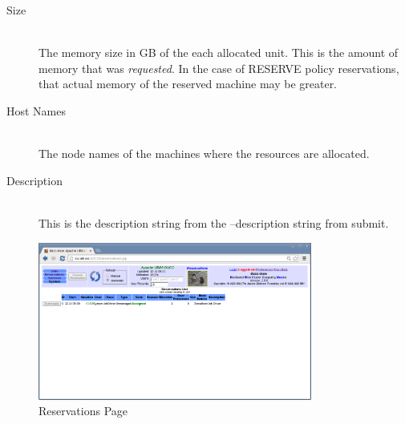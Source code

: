 \begin{description}
\item[Size] \hfill \\
  The memory size in GB of the each allocated unit.  This is the amount of memory that
  was {\em requested}.  In the case of RESERVE policy reservations, that actual memory
  of the reserved machine may be greater.
  
\item[Host Names] \hfill \\
  The node names of the machines where the resources are allocated.
  
\item[Description] \hfill \\
  This is the description string from the --description string from submit.
\end{description}

    \begin{figure}[ht!]
    \centering
    \includegraphics[width=90mm]{images/ducc-webserver/Reservations.png}
    \caption{Reservations Page}
    \label{overflow}
    \end{figure}